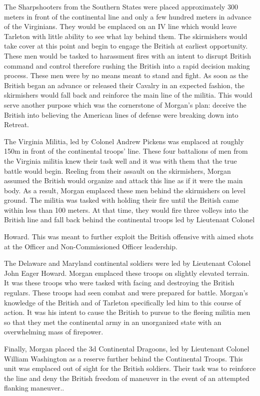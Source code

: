 The Sharpshooters from the Southern States were placed approximately 300 meters
in front of the continental line \cite[48]{moncure_cowpens_1996} and only a few
hundred meters in advance of the Virginians. They would be emplaced on an IV
line which would leave Tarleton with little ability to see what lay behind
them. The skirmishers would take cover at this point and begin to engage the
British at earliest opportunity. These men would be tasked to harassment fires
with an intent to disrupt British command and control therefore rushing the
British into a rapid decision making process. These men were by no means meant
to stand and fight.  As soon as the British began an advance or released their
Cavalry in an expected fashion, the skirmishers would fall back and reinforce
the main line of the militia. This would serve another purpose which was the
cornerstone of Morgan's plan: deceive the British into believing the American
lines of defense were breaking down into Retreat.

The Virginia Militia, led by Colonel Andrew Pickens was emplaced at roughly
150m in front of the continental troops' line. These four battalions of men
from the Virginia militia knew their task well and it was with them that the
true battle would begin. Reeling from their assault on the skirmishers, Morgan
assumed the British would organize and attack this line as if it were the main
body. As a result, Morgan emplaced these men behind the skirmishers on level
ground. The militia was tasked with holding their fire until the British came
within less than 100 meters. At that time, they would fire three volleys into
the British line and fall back behind the continental troops led by Lieutenant
Colonel

Howard. This was meant to further exploit the British offensive with aimed
shots at the Officer and Non-Commissioned Officer leadership.

The Delaware and Maryland continental soldiers were led by Lieutenant Colonel
John Eager Howard. Morgan emplaced these troops on slightly elevated terrain.
It was these troops who were tasked with facing and destroying the British
regulars. These troops had seen combat and were prepared for battle. Morgan's
knowledge of the British and of Tarleton specifically led him to this course of
action. It was his intent to cause the British to pursue to the fleeing militia
men so that they met the continental army in an unorganized state with an
overwhelming mass of firepower.

Finally, Morgan placed the 3d Continental Dragoons, led by Lieutenant Colonel
William Washington as a reserve further behind the Continental Troops. This
unit was emplaced out of sight for the British soldiers. Their task was to
reinforce the line and deny the British freedom of maneuver in the event of an
attempted flanking maneuver..


